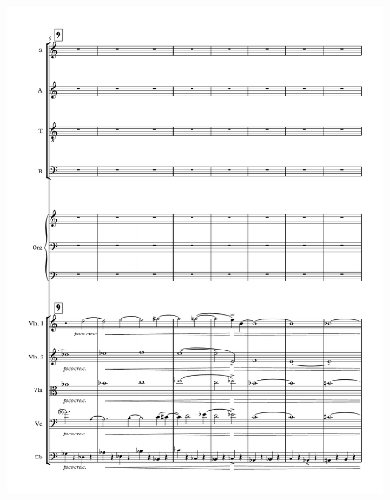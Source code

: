 \begin{figure}[htbp]
    \centering
	\includegraphics[width=6.5in]{figures/Stabat_Mater_2.pdf}
\end{figure}

